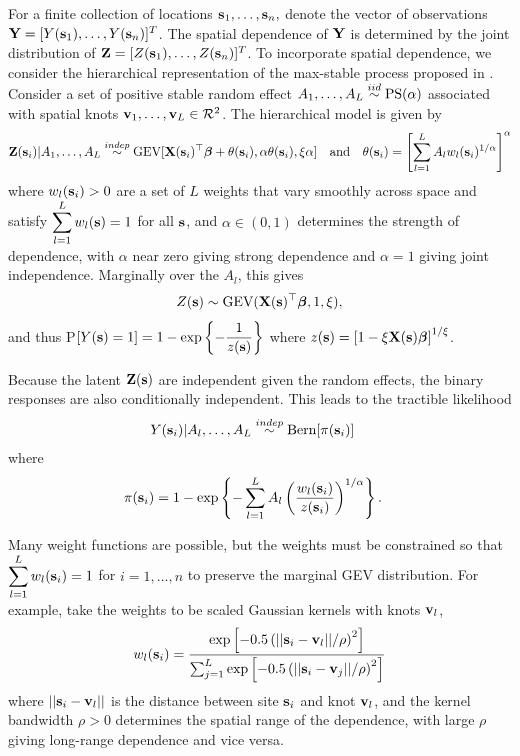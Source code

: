 \documentclass[11pt]{article}
\begin{document}
For a finite collection of locations $\mbox{\bf s}_1, \ldots, \mbox{\bf s}_n,$ denote the vector of observations $\mbox{\bf Y} = [Y(\mbox{\bf s}_1), \ldots, Y(\mbox{\bf s}_n)]^T$.
The spatial dependence of $\mbox{\bf Y}$ is determined by the joint distribution of $\mbox{\bf Z} = [Z(\mbox{\bf s}_1),\ldots, Z(\mbox{\bf s}_n)]^T$.
To incorporate spatial dependence, we consider the hierarchical representation of the max-stable process proposed in \citet{Reich2012}.
Consider a set of positive stable random effect $A_1, \ldots, A_L \stackrel{iid}{\sim} \text{PS}(\alpha)$ associated with spatial knots $\mbox{\bf v}_1, \ldots, \mbox{\bf v}_L \in {\cal R}^2$.
The hierarchical model is given by
\begin{align} \label{rbeq:hiermodel}
  \mbox{\bf Z}(\mbox{\bf s}_i) | A_1, \ldots, A_L \stackrel{indep}{\sim} \text{GEV}[\mbox{\bf X}(\mbox{\bf s}_i)^\top \mbox{\boldmath $\beta$} + \theta(\mbox{\bf s}_i), \alpha \theta(\mbox{\bf s}_i), \xi \alpha] \quad \text{and} \quad \theta(\mbox{\bf s}_i) = \left[\sum_{l = 1}^L A_l w_l (\mbox{\bf s}_i)^{1 / \alpha} \right]^\alpha
\end{align}
where $w_{l}(\mbox{\bf s}_i) > 0$ are a set of $L$ weights that vary smoothly across space and satisfy $\displaystyle \sum_{l = 1}^L w_l(\mbox{\bf s}) = 1$ for all $\mbox{\bf s}$, and $\alpha\in(0,1)$ determines the strength of dependence, with $\alpha$ near zero giving strong dependence and $\alpha=1$ giving joint independence.
Marginally over the $A_l$, this gives
\begin{align}
  Z(\mbox{\bf s}) \sim \text{GEV}(\mbox{\bf X}(\mbox{\bf s})^\top \mbox{\boldmath $\beta$}, 1, \xi),
\end{align}
and thus P$[Y(\mbox{\bf s}) = 1] = 1 - \exp\left\{-\displaystyle \frac{1}{z(\mbox{\bf s})}\right\}$ where $z(\mbox{\bf s}) = \left[1 - \xi \mbox{\bf X}(\mbox{\bf s}) \mbox{\boldmath $\beta$}\right]^{1 / \xi}$.

Because the latent $\mbox{\bf Z}(\mbox{\bf s})$ are independent given the random effects, the binary responses are also conditionally independent.
This leads to the tractible likelihood
\begin{align} \label{rbeq:condlike}
  Y(\mbox{\bf s}_i) | A_l, \ldots, A_L &\stackrel{indep}{\sim} \text{Bern}[\pi(\mbox{\bf s}_i)]
\end{align}
where
\begin{align} \label{rbeq:pyeq1cond}
  \pi(\mbox{\bf s}_i) &= 1 - \exp \left\{ -\displaystyle \sum_{ l = 1 }^{L} A_l \left( \frac{ w_{l}(\mbox{\bf s}_i) }{ z(\mbox{\bf s}_i) } \right)^{ 1/\alpha} \right\}.
\end{align}

Many weight functions are possible, but the weights must be constrained so that $\displaystyle \sum_{l=1}^L w_{l}(\mbox{\bf s}_i)=1$ for $i=1,\ldots,n$ to preserve the marginal GEV distribution.
For example, \cite{Reich2012} take the weights to be scaled Gaussian kernels with knots $\mbox{\bf v}_l$,
\begin{align}\label{rbeq:w}
   w_{l}(\mbox{\bf s}_i) = \frac{\exp\left[-0.5\left(||\mbox{\bf s}_i-\mbox{\bf v}_l||/\rho\right)^2\right]}
                 {\sum_{j=1}^L\exp\left[-0.5\left(||\mbox{\bf s}_i-\mbox{\bf v}_j||/\rho\right)^2\right]}
\end{align}
where $||\mbox{\bf s}_i - \mbox{\bf v}_l||$ is the distance between site $\mbox{\bf s}_i$ and knot $\mbox{\bf v}_l$, and the kernel bandwidth $\rho>0$ determines the spatial range of the dependence, with large $\rho$ giving long-range dependence and vice versa.
\end{document}
